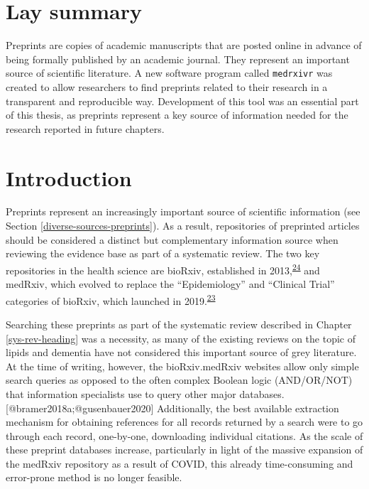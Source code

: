 \documentclass[a4paper, twoside]{templates/ociamthesis}
\begin{document}
\hypertarget{lay-summary}{%
\section{Lay summary}\label{lay-summary}}

Preprints are copies of academic manuscripts that are posted online in advance of being formally published by an academic journal. They represent an important source of scientific literature. A new software program called \texttt{medrxivr} was created to allow researchers to find preprints related to their research in a transparent and reproducible way. Development of this tool was an essential part of this thesis, as preprints represent a key source of information needed for the research reported in future chapters.

\hypertarget{introduction-1}{%
\section{Introduction}\label{introduction-1}}

Preprints represent an increasingly important source of scientific information (see Section \ref{diverse-sources-preprints}). As a result, repositories of preprinted articles should be considered a distinct but complementary information source when reviewing the evidence base as part of a systematic review. The two key repositories in the health science are bioRxiv, established in 2013,\textsuperscript{\protect\hyperlink{ref-sever2019}{24}} and medRxiv, which evolved to replace the ``Epidemiology'' and ``Clinical Trial'' categories of bioRxiv, which launched in 2019.\textsuperscript{\protect\hyperlink{ref-rawlinson2019}{23}}

Searching these preprints as part of the systematic review described in Chapter \ref{sys-rev-heading} was a necessity, as many of the existing reviews on the topic of lipids and dementia have not considered this important source of grey literature. At the time of writing, however, the bioRxiv.medRxiv websites allow only simple search queries as opposed to the often complex Boolean logic (AND/OR/NOT) that information specialists use to query other major databases.{[}@bramer2018a;@gusenbauer2020{]} Additionally, the best available extraction mechanism for obtaining references for all records returned by a search were to go through each record, one-by-one, downloading individual citations. As the scale of these preprint databases increase, particularly in light of the massive expansion of the medRxiv repository as a result of COVID, this already time-consuming and error-prone method is no longer feasible.
\end{document}
